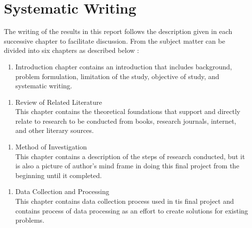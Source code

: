 \section{Systematic Writing}
The writing of the results in this report follows the description given in each successive chapter to facilitate discussion. From the subject matter can be divided into six chapters as described below :
\begin{enumerate}[label=Chapter I \hspace{5mm} : \hspace{2mm}, leftmargin=*, topsep=0pt, itemsep=-1ex, partopsep=1ex, parsep=1ex]
\item Introduction chapter contains an introduction that includes background, problem formulation, limitation of the study, objective of study, and systematic writing.
\end{enumerate}
\begin{enumerate}[label=Chapter II \hspace{3.5mm} : \hspace{2mm}, leftmargin=*, topsep=0pt, itemsep=-1ex, partopsep=1ex, parsep=1ex]
\item Review of Related Literature\\This chapter contains the theoretical foundations that support and directly relate to research to be conducted from books, research journals, internet, and other literary sources.
\end{enumerate}
\begin{enumerate}[label=Chapter III \hspace{2mm} : \hspace{2mm}, leftmargin=*, topsep=0pt, itemsep=-1ex, partopsep=1ex, parsep=1ex]
\item Method of Investigation\\This chapter contains a description of the steps of research conducted, but it is also a picture of author's mind frame in doing this final project from the beginning until it completed.
\end{enumerate}
\begin{enumerate}[label=Chapter IV \hspace{2mm} : \hspace{2mm}, leftmargin=*, topsep=0pt, itemsep=-1ex, partopsep=1ex, parsep=1ex]
\item Data Collection and Processing \\This chapter contains data collection process used in tis final project and contains process of data processing as an effort to create solutions for existing problems.
\end{enumerate}
